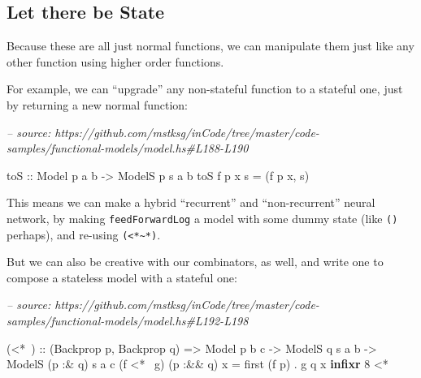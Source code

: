 \documentclass[]{article}
\newenvironment{Shaded}{}{}
\newcommand{\CommentTok}[1]{\textcolor[rgb]{0.38,0.63,0.69}{\textit{#1}}}
\newcommand{\DataTypeTok}[1]{\textcolor[rgb]{0.56,0.13,0.00}{#1}}
\newcommand{\DecValTok}[1]{\textcolor[rgb]{0.25,0.63,0.44}{#1}}
\newcommand{\FunctionTok}[1]{\textcolor[rgb]{0.02,0.16,0.49}{#1}}
\newcommand{\KeywordTok}[1]{\textcolor[rgb]{0.00,0.44,0.13}{\textbf{#1}}}
\newcommand{\NormalTok}[1]{#1}
\newcommand{\OtherTok}[1]{\textcolor[rgb]{0.00,0.44,0.13}{#1}}
\begin{document}
\hypertarget{let-there-be-state}{%
\subsection{Let there be State}\label{let-there-be-state}}

Because these are all just normal functions, we can manipulate them just like
any other function using higher order functions.

For example, we can ``upgrade'' any non-stateful function to a stateful one,
just by returning a new normal function:

\begin{Shaded}
\begin{Highlighting}[]
\CommentTok{-- source: https://github.com/mstksg/inCode/tree/master/code-samples/functional-models/model.hs#L188-L190}

\OtherTok{toS ::} \DataTypeTok{Model}\NormalTok{  p   a b}
    \OtherTok{->} \DataTypeTok{ModelS}\NormalTok{ p s a b}
\NormalTok{toS f p x s }\FunctionTok{=}\NormalTok{ (f p x, s)}
\end{Highlighting}
\end{Shaded}

This means we can make a hybrid ``recurrent'' and ``non-recurrent'' neural
network, by making \texttt{feedForwardLog\textquotesingle{}} a model with some
dummy state (like \texttt{()} perhaps), and re-using
\texttt{(\textless{}*\textasciitilde{}*)}.

But we can also be creative with our combinators, as well, and write one to
compose a stateless model with a stateful one:

\begin{Shaded}
\begin{Highlighting}[]
\CommentTok{-- source: https://github.com/mstksg/inCode/tree/master/code-samples/functional-models/model.hs#L192-L198}

\NormalTok{(}\FunctionTok{<*~}\NormalTok{)}
\OtherTok{  ::}\NormalTok{ (}\DataTypeTok{Backprop}\NormalTok{ p, }\DataTypeTok{Backprop}\NormalTok{ q)}
    \OtherTok{=>} \DataTypeTok{Model}\NormalTok{   p         b c}
    \OtherTok{->} \DataTypeTok{ModelS}\NormalTok{       q  s a b}
    \OtherTok{->} \DataTypeTok{ModelS}\NormalTok{ (p }\FunctionTok{:&}\NormalTok{ q) s a c}
\NormalTok{(f }\FunctionTok{<*~}\NormalTok{ g) (p }\FunctionTok{:&&}\NormalTok{ q) x }\FunctionTok{=}\NormalTok{ first (f p) }\FunctionTok{.}\NormalTok{ g q x}
\KeywordTok{infixr} \DecValTok{8} \FunctionTok{<*~}
\end{Highlighting}
\end{Shaded}
\end{document}
